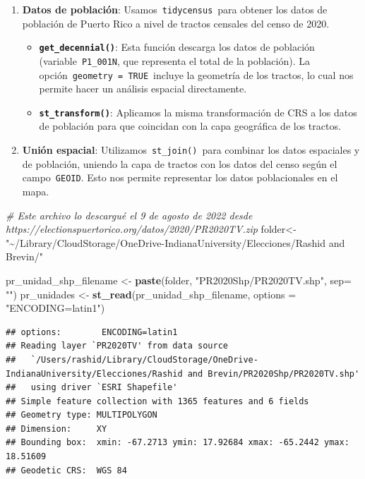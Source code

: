 \documentclass[
]{article}
\newenvironment{Shaded}{\begin{snugshade}}{\end{snugshade}}
\newcommand{\AttributeTok}[1]{\textcolor[rgb]{0.13,0.29,0.53}{#1}}
\newcommand{\CommentTok}[1]{\textcolor[rgb]{0.56,0.35,0.01}{\textit{#1}}}
\newcommand{\FunctionTok}[1]{\textcolor[rgb]{0.13,0.29,0.53}{\textbf{#1}}}
\newcommand{\NormalTok}[1]{#1}
\newcommand{\OtherTok}[1]{\textcolor[rgb]{0.56,0.35,0.01}{#1}}
\newcommand{\StringTok}[1]{\textcolor[rgb]{0.31,0.60,0.02}{#1}}
\providecommand{\tightlist}{%
  \setlength{\itemsep}{0pt}\setlength{\parskip}{0pt}}
\begin{document}
\begin{enumerate}
\def\labelenumi{\arabic{enumi}.}
\setcounter{enumi}{1}
\tightlist
\item
  \textbf{Datos de población}: Usamos~\texttt{tidycensus}~para obtener
  los datos de población de Puerto Rico a nivel de tractos censales del
  censo de 2020.

  \begin{itemize}
  \item
    \textbf{\texttt{get\_decennial()}}: Esta función descarga los datos
    de población (variable~\texttt{P1\_001N}, que representa el total de
    la población). La opción~\texttt{geometry\ =\ TRUE}~incluye la
    geometría de los tractos, lo cual nos permite hacer un análisis
    espacial directamente.
  \item
    \textbf{\texttt{st\_transform()}}: Aplicamos la misma transformación
    de CRS a los datos de población para que coincidan con la capa
    geográfica de los tractos.
  \end{itemize}
\item
  \textbf{Unión espacial}: Utilizamos~\texttt{st\_join()}~para combinar
  los datos espaciales y de población, uniendo la capa de tractos con
  los datos del censo según el campo~\texttt{GEOID}. Esto nos permite
  representar los datos poblacionales en el mapa.
\end{enumerate}

\begin{Shaded}
\begin{Highlighting}[]
\CommentTok{\# Este archivo lo descargué el 9 de agosto de 2022 desde https://electionspuertorico.org/datos/2020/PR2020TV.zip}
\NormalTok{folder}\OtherTok{\textless{}{-}}\StringTok{"\textasciitilde{}/Library/CloudStorage/OneDrive{-}IndianaUniversity/Elecciones/Rashid and Brevin/"}

\NormalTok{pr\_unidad\_shp\_filename }\OtherTok{\textless{}{-}} \FunctionTok{paste}\NormalTok{(folder, }\StringTok{"PR2020Shp/PR2020TV.shp"}\NormalTok{, }\AttributeTok{sep=} \StringTok{""}\NormalTok{)}
\NormalTok{pr\_unidades }\OtherTok{\textless{}{-}} \FunctionTok{st\_read}\NormalTok{(pr\_unidad\_shp\_filename, }\AttributeTok{options =} \StringTok{"ENCODING=latin1"}\NormalTok{)}
\end{Highlighting}
\end{Shaded}

\begin{verbatim}
## options:        ENCODING=latin1 
## Reading layer `PR2020TV' from data source 
##   `/Users/rashid/Library/CloudStorage/OneDrive-IndianaUniversity/Elecciones/Rashid and Brevin/PR2020Shp/PR2020TV.shp' 
##   using driver `ESRI Shapefile'
## Simple feature collection with 1365 features and 6 fields
## Geometry type: MULTIPOLYGON
## Dimension:     XY
## Bounding box:  xmin: -67.2713 ymin: 17.92684 xmax: -65.2442 ymax: 18.51609
## Geodetic CRS:  WGS 84
\end{verbatim}
\end{document}
